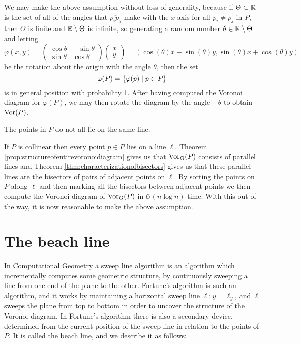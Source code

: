 \begin{rmk}
We may make the above assumption without loss of generality, because if $\Theta \subset \mathbb{R}$ is the set of all of the angles that $\overline{p_i p_j}$ make with the $x$-axis for all $p_i \ne p_j$ in $P$, then $\Theta$ is finite and $\mathbb{R} \setminus \Theta$ is infinite, so generating a random number $\theta \in \mathbb{R} \setminus \Theta$ and letting
\[
    \varphi (x, y) = \begin{pmatrix} \cos \theta & -\sin \theta \\ \sin \theta & \cos \theta \end{pmatrix} \begin{pmatrix} x \\ y \end{pmatrix}
    = (\cos(\theta) x - \sin(\theta) y, \sin(\theta) x + \cos(\theta) y)
\]
be the rotation about the origin with the angle $\theta$, then the set
\[
    \varphi(P) = \{\varphi(p) \mid p \in P\}
\]
is in general position with probability 1. After having computed the Voronoi diagram for $\varphi(P)$, we may then rotate the diagram by the angle $-\theta$ to obtain $\operatorname{Vor}(P)$.
\end{rmk}

\begin{assume} \label{ass:notsameline}
The points in $P$ do not all lie on the same line.
\end{assume}

\begin{rmk}
If $P$ is collinear then every point $p \in P$ lies on a line $\ell$. Theorem \ref{prop:structureofentirevoronoidiagram} gives us that $\operatorname{Vor_{G}}(P)$ consists of parallel lines and Theorem \ref{thm:characterizationofbisectors} gives us that these parallel lines are the bisectors of pairs of adjacent points on $\ell$. By sorting the points on $P$ along $\ell$ and then marking all the bisectors between adjacent points we then compute the Voronoi diagram of $\operatorname{Vor_{G}}(P)$ in $\mathcal{O}(n \log n)$ time. With this out of the way, it is now reasonable to make the above assumption.
\end{rmk}

\section{The beach line}
In Computational Geometry a sweep line algorithm is an algorithm which incrementally computes some geometric structure, by continuously sweeping a line from one end of the plane to the other. Fortune's algorithm is such an algorithm, and it works by maintaining a horizontal sweep line $\ell \colon y = \ell_y$, and $\ell$ sweeps the plane from top to bottom in order to uncover the structure of the Voronoi diagram. In Fortune's algorithm there is also a secondary device, determined from the current position of the sweep line in relation to the points of $P$. It is called the beach line, and we describe it as follows:

